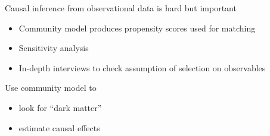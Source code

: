 \documentclass{beamer}
\begin{document}
\begin{frame}

Causal inference from observational data is hard but important
\pause
\begin{itemize}
\item Community model produces propensity scores used for matching
\pause
\item Sensitivity analysis
\pause
\item In-depth interviews to check assumption of selection on observables
\end{itemize}

\end{frame}
\begin{frame}

Use community model to
\begin{itemize}
\item look for ``dark matter''
\item estimate causal effects
\end{itemize}

\end{frame}
\end{document}
